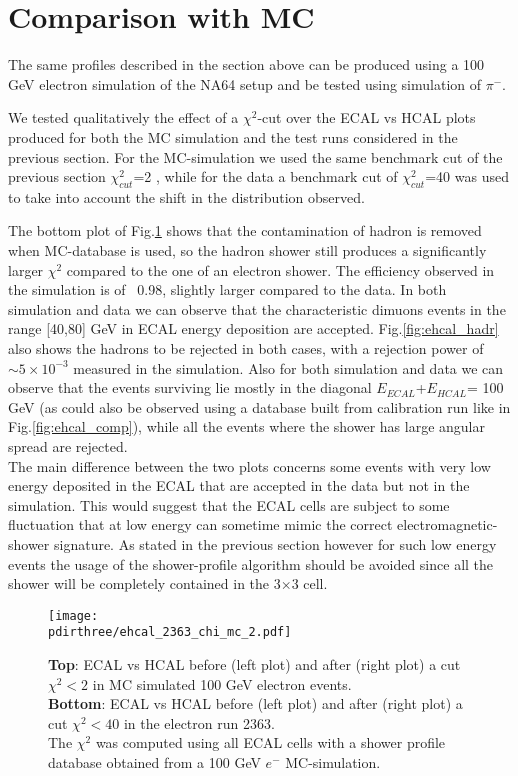 \iffalse

\section{Comparison with MC}
\label{ch3:sec:mc}
The same profiles described in the section above can be produced using
a 100 GeV electron simulation of the NA64 setup\cite{na64-simulation} and be tested using simulation of $\pi^-$.

We tested qualitatively the effect of a $\chi^{2}$-cut over the
ECAL vs HCAL plots produced for both the MC simulation
and the test runs considered in the previous section. For the
MC-simulation we used the same benchmark cut of the previous section
$\chi^2_{cut}$=2 , while for the data a benchmark cut of
$\chi^2_{cut}$=40 was used to take into account the shift in the
distribution observed.

The bottom plot of Fig.\ref{fig:ehcal_elec} shows that the
contamination of hadron is removed when MC-database is used, so
the hadron shower still produces a significantly larger $\chi^{2}$
compared to the one of an electron shower. The efficiency
observed in the simulation is of ~0.98, slightly larger compared to the data. 
In both simulation and data we can observe that the characteristic
dimuons events in the range [40,80] GeV in ECAL energy
deposition are accepted.
Fig.\ref{fig:ehcal_hadr} also shows the hadrons to be rejected in both
cases, with a rejection power of $\sim 5\times 10^{-3}$ measured in the
simulation. Also for both simulation and data we can observe that the
events surviving lie mostly in the diagonal $E_{ECAL}$+$E_{HCAL}$= 100
GeV (as could also be observed using a database built from calibration run like in Fig.\ref{fig:ehcal_comp}), while all the events where the shower has large angular spread are rejected.
\\
The main difference between the two plots concerns some events with very low energy deposited in the ECAL that are accepted in the data but not in the simulation. This would suggest that the ECAL cells are subject to some fluctuation that at low energy can sometime mimic the correct electromagnetic-shower signature. As stated in the previous section however for such low energy events the usage of the shower-profile algorithm should be avoided since all the shower will be completely contained in the 3$\times$3 cell.\\

\begin{figure}[h!]
  \begin{center}
    \texttt{[image: \\pdirthree/ehcal\_2363\_chi\_mc\_2.pdf]}
  \end{center}
  \caption{\textbf{Top}: ECAL vs HCAL before (left plot) and
    after (right plot) a cut
    $\chi^2<2$ in MC simulated 100 GeV electron events. \\
    \textbf{Bottom}: ECAL vs HCAL before (left plot) and after (right
    plot) a cut
    $\chi^2<40$ in the electron run 2363.\\
    The $\chi^2$ was computed using all ECAL cells with a shower
    profile database obtained from a 100 GeV $e^-$ MC-simulation. }
  \label{fig:ehcal_elec}
\end{figure}

